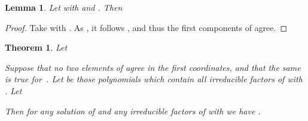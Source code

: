\documentclass[a4paper]{sig-alternate}
\newtheorem{theorem}{Theorem}
\newtheorem{lemma}{Lemma}
\begin{document}
\begin{lemma}\label{Lemma:UniqueTComponents}
Let  with  and . Then

\end{lemma}
\begin{proof}
Take  with . As , it follows , and thus the first  components of  agree.
\end{proof}

\begin{theorem}\label{thm:disp}
  Let
  
  Suppose that no two elements of  agree in the first  coordinates,
  and that the same is true for~. Let  be those polynomials which contain all irreducible factors  of  with . Let
  
  Then for any solution  of  and any irreducible
  factors  of  with  we have .
\end{theorem}
\end{document}
